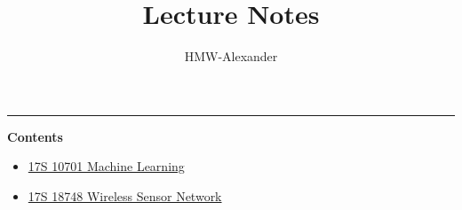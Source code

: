 \documentclass[letterpaper,11pt]{article}
\title{\textbf{Lecture Notes}}
\author{HMW-Alexander}
\newcommand{\panhline}{\begin{center}\rule{\textwidth}{1pt}\end{center}}
\begin{document}
\maketitle

\panhline
\textbf{Contents}

\begin{itemize}
	\item \href{./17S_10701_MachineLearning/index.html}{17S 10701 Machine Learning}
	\item \href{./17S_18748_WirelessSensorNetwork/document.html}{17S 18748 Wireless Sensor Network}
\end{itemize}
\end{document}
